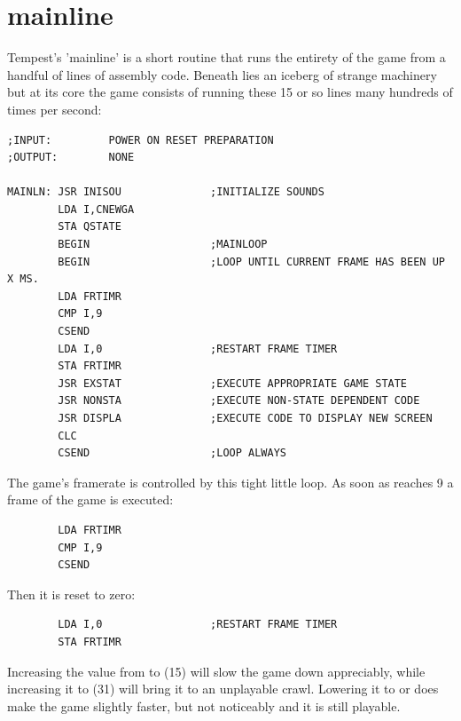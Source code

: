 \chapter{mainline}
\label{sec:listing}
\lstset{style=6502Style}
\lhead[tempest]{}

Tempest's 'mainline' is a short routine that runs the entirety of the game from a handful of lines
of assembly code. Beneath lies an iceberg of strange machinery but at its core the game consists of
running these 15 or so lines many hundreds of times per second:

\begin{lstlisting}
;INPUT:         POWER ON RESET PREPARATION
;OUTPUT:        NONE

MAINLN: JSR INISOU              ;INITIALIZE SOUNDS
        LDA I,CNEWGA
        STA QSTATE
        BEGIN                   ;MAINLOOP
        BEGIN                   ;LOOP UNTIL CURRENT FRAME HAS BEEN UP X MS.
        LDA FRTIMR
        CMP I,9
        CSEND
        LDA I,0                 ;RESTART FRAME TIMER
        STA FRTIMR
        JSR EXSTAT              ;EXECUTE APPROPRIATE GAME STATE
        JSR NONSTA              ;EXECUTE NON-STATE DEPENDENT CODE
        JSR DISPLA              ;EXECUTE CODE TO DISPLAY NEW SCREEN
        CLC
        CSEND                   ;LOOP ALWAYS
\end{lstlisting}

The game's framerate is controlled by this tight little loop. As soon as  reaches 9 a frame
of the game is executed:
\begin{lstlisting}
        LDA FRTIMR
        CMP I,9
        CSEND
\end{lstlisting}
Then it is reset to zero:
\begin{lstlisting}
        LDA I,0                 ;RESTART FRAME TIMER
        STA FRTIMR
\end{lstlisting}
Increasing the value from  to  (15) will slow the game down appreciably, while increasing
it to  (31) will bring it to an unplayable crawl. Lowering it to  or  does make the game slightly
faster, but not noticeably and it is still playable.


